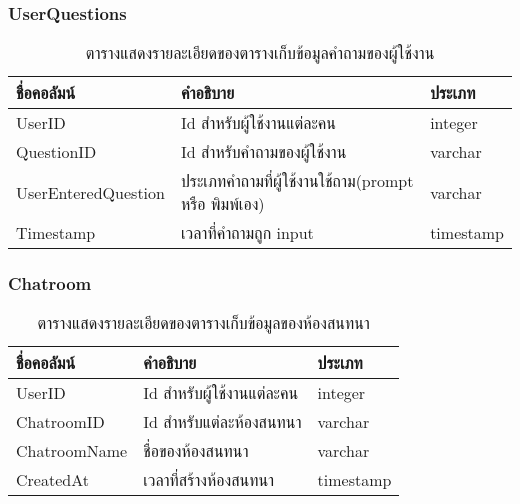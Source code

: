 \documentclass[12pt,oneside,openright,a4paper]{cpe-thai-project}
\begin{document}
\subsubsection{UserQuestions}
\begin{table}[!h]
\caption{ตารางแสดงรายละเอียดของตารางเก็บข้อมูลคำถามของผู้ใช้งาน}\label{tbl:table3.3}
\begin{tabular}{|l|l|l|}
\hline
\textbf{ชื่อคอลัมน์} & \textbf{คำอธิบาย}                                                           & \textbf{ประเภท} \\ \hline
UserID               & Id สำหรับผู้ใช้งานแต่ละคน                                                   & integer         \\ \hline
QuestionID           & Id สำหรับคำถามของผู้ใช้งาน                                                  & varchar         \\ \hline
UserEnteredQuestion  & ประเภทคำถามที่ผู้ใช้งานใช้ถาม(prompt หรือ พิมพ์เอง) & varchar         \\ \hline
Timestamp            & เวลาที่คำถามถูก input                               & timestamp       \\ \hline
\end{tabular}
\end{table}

\subsubsection{Chatroom}
\begin{table}[!h]
\caption{ตารางแสดงรายละเอียดของตารางเก็บข้อมูลของห้องสนทนา}\label{tbl:table3.4}
\begin{tabular}{|l|l|l|}
\hline
\textbf{ชื่อคอลัมน์} & \textbf{คำอธิบาย}                             & \textbf{ประเภท} \\ \hline
UserID               & Id สำหรับผู้ใช้งานแต่ละคน                     & integer         \\ \hline
ChatroomID           & Id สำหรับแต่ละห้องสนทนา                       & varchar         \\ \hline
ChatroomName         & ชื่อของห้องสนทนา      & varchar         \\ \hline
CreatedAt            & เวลาที่สร้างห้องสนทนา & timestamp       \\ \hline
\end{tabular}
\end{table} \newpage
\end{document}
